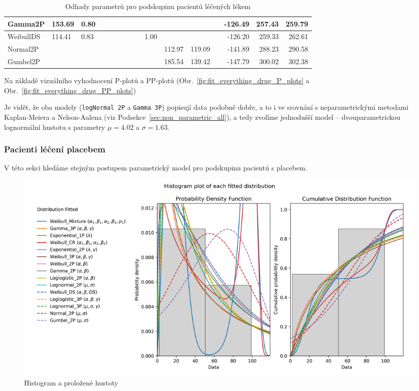 \documentclass[a4, 11pt]{article}
\theoremstyle{definition}
\theoremstyle{remark}
\begin{document}
\begin{table}[H]
\begin{tabular}{|l|l|l|l|l|l|l|l|l|l|l|l|l|r|r|r|}
        Gamma2P       & 153.69 & 0.80 &      &        &      &        &        &      &      &        &        &      & -126.49 & 257.43 & 259.79 \\ \hline
        WeibullDS     & 114.41 & 0.83 &      &        &      &        &        &      & 1.00 &        &        &      & -126.20 & 259.33 & 262.61 \\ \hline
        Normal2P      &        &      &      &        &      &        &        &      &      & 112.97 & 119.09 &      & -141.89 & 288.23 & 290.58 \\ \hline
        Gumbel2P      &        &      &      &        &      &        &        &      &      & 185.54 & 139.42 &      & -147.79 & 300.02 & 302.38 \\ \hline
    \end{tabular}
    \caption{Odhady parametrů pro podskupinu pacientů léčených lékem}
    \label{tab:fitall_output_parameters_tab}
    \normalsize
\end{table}

	Na základě vizuálního vyhodnocení P-plotů a PP-plotů (Obr.~\ref{fig:fit_everything_drug_P_plots} a Obr.~\ref{fig:fit_everything_drug_PP_plots}) 
	
	Je vidět, že oba modely (\texttt{logNormal 2P} a \texttt{Gamma 3P}) popisují data podobně dobře, a to i ve srovnání s neparametrickými metodami Kaplan-Meiera a Nelson-Aalena (viz Podsekce~\ref{sec:non_parametric_all}), a tedy zvolíme jednodušší model -- dvouparametrickou lognormální hustotu s parametry $\mu = 4.02$ a $\sigma = 1.63$.
	
	
	
	\subsubsection{Pacienti léčení placebem} \label{sec:parametric_placebo}
	
    V této sekci hledáme stejným postupem parametrický model pro podskupinu pacientů s placebem.
	\begin{figure}[H]
		\centering
		\includegraphics[width=0.8\linewidth]{img/fiteverything_placebo_histogram.png}
		\caption{Histogram a proložené hustoty}
		\label{fig:fit_everything_hist_placebo}
	\end{figure}
\end{document}
